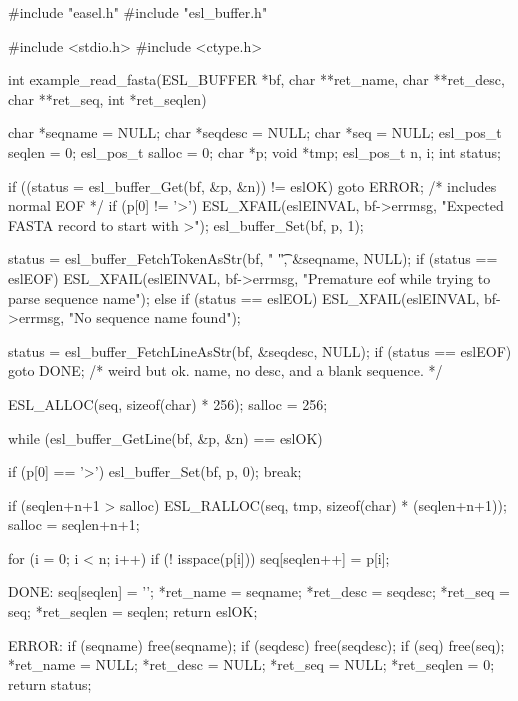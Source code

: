 \begin{cchunk}
#include "easel.h"
#include "esl_buffer.h"

#include <stdio.h>
#include <ctype.h>

int
example_read_fasta(ESL_BUFFER *bf, char **ret_name, char **ret_desc, char **ret_seq, int *ret_seqlen)
{
  char      *seqname = NULL;
  char      *seqdesc = NULL;
  char      *seq     = NULL;
  esl_pos_t  seqlen  = 0;
  esl_pos_t  salloc  = 0;
  char      *p;
  void      *tmp;
  esl_pos_t  n, i;
  int        status;

  if ((status = esl_buffer_Get(bf, &p, &n)) != eslOK) goto ERROR; /* includes normal EOF */
  if (p[0] != '>') ESL_XFAIL(eslEINVAL, bf->errmsg, "Expected FASTA record to start with >");
  esl_buffer_Set(bf, p, 1);

  status = esl_buffer_FetchTokenAsStr(bf, " \t", &seqname, NULL);
  if      (status == eslEOF) ESL_XFAIL(eslEINVAL, bf->errmsg, "Premature eof while trying to parse sequence name");
  else if (status == eslEOL) ESL_XFAIL(eslEINVAL, bf->errmsg, "No sequence name found");

  status = esl_buffer_FetchLineAsStr(bf, &seqdesc, NULL);
  if (status == eslEOF) goto DONE; /* weird but ok. name, no desc, and a blank sequence. */

  ESL_ALLOC(seq, sizeof(char) * 256);
  salloc = 256;

  while (esl_buffer_GetLine(bf, &p, &n) == eslOK)
    {
      if (p[0] == '>') { esl_buffer_Set(bf, p, 0); break; }

      if (seqlen+n+1 > salloc) { 
	ESL_RALLOC(seq, tmp, sizeof(char) * (seqlen+n+1));  
	salloc = seqlen+n+1; 
      }

      for (i = 0; i < n; i++) {
	if (! isspace(p[i])) { seq[seqlen++] = p[i]; }
      }
    }
    
 DONE:
  seq[seqlen] = '\0';
  *ret_name   = seqname;
  *ret_desc   = seqdesc;
  *ret_seq    = seq;
  *ret_seqlen = seqlen;
  return eslOK;

 ERROR:
  if (seqname) free(seqname);  
  if (seqdesc) free(seqdesc); 
  if (seq)     free(seq);  
  *ret_name   = NULL;
  *ret_desc   = NULL;
  *ret_seq    = NULL;
  *ret_seqlen = 0;
  return status;
}
\end{cchunk}
